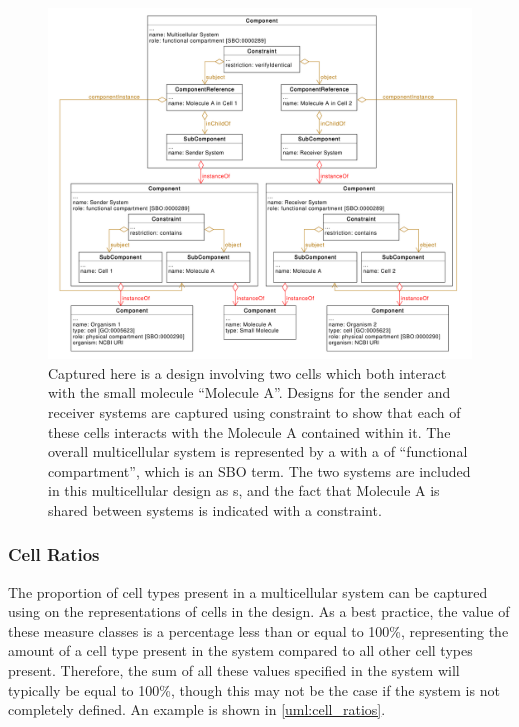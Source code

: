 \begin{figure}[ht]
	\begin{center}
		\includegraphics[width=\textwidth]{uml/two_cell_representation}
		\caption[]{Captured here is a design involving two cells which both interact with the small molecule ``Molecule A''. 
		Designs for the sender and receiver systems are captured using constraint to show that each of these cells interacts with the Molecule A contained within it.
		The overall multicellular system is represented by a  with a  of ``functional compartment'', which is an SBO term.
		The two systems are included in this multicellular design as s, and the fact that Molecule A is shared between systems is indicated with a constraint.}
		\label{uml:multiple_cell_representation}
	\end{center}
\end{figure}

\subsubsection{Cell Ratios}

The proportion of cell types present in a multicellular system can be captured using  on the representations of cells in the design.
As a best practice, the value of these measure classes is a percentage less than or equal to 100\%, representing the amount of a cell type present in the system compared to all other cell types present. 
Therefore, the sum of all these values specified in the system will typically be equal to 100\%, though this may not be the case if the system is not completely defined. 
An example is shown in \ref{uml:cell_ratios}.

